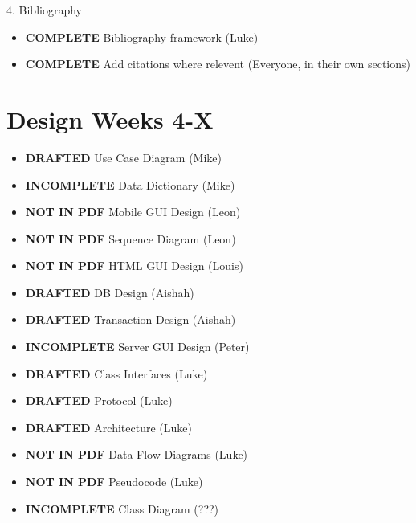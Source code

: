 4. Bibliography
\begin{itemize}
\item \textbf{COMPLETE} Bibliography framework (Luke)
\item \textbf{COMPLETE} Add citations where relevent (Everyone, in their own sections)
\end{itemize}

\section{Design \textbf{Weeks 4-X}}
\begin{itemize}
\item \textbf{DRAFTED}       Use Case Diagram (Mike)
\item \textbf{INCOMPLETE}    Data Dictionary (Mike)
\item \textbf{NOT IN PDF}    Mobile GUI Design (Leon)
\item \textbf{NOT IN PDF}    Sequence Diagram (Leon)
\item \textbf{NOT IN PDF}    HTML GUI Design (Louis)
\item \textbf{DRAFTED}       DB Design (Aishah)
\item \textbf{DRAFTED}       Transaction Design (Aishah)
\item \textbf{INCOMPLETE}    Server GUI Design (Peter)
\item \textbf{DRAFTED}       Class Interfaces (Luke)
\item \textbf{DRAFTED}       Protocol (Luke)
\item \textbf{DRAFTED}       Architecture (Luke)
\item \textbf{NOT IN PDF}    Data Flow Diagrams (Luke)
\item \textbf{NOT IN PDF}    Pseudocode (Luke)
\item \textbf{INCOMPLETE}    Class Diagram (???)
\end{itemize}
